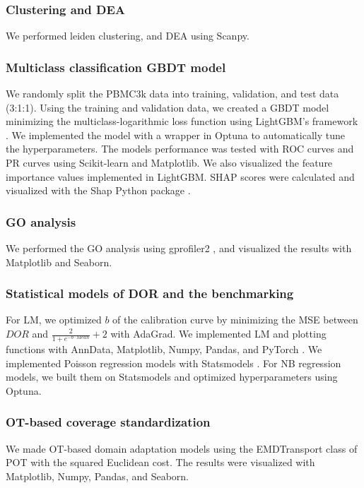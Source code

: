\documentclass{article}
\begin{document}
\subsubsection*{Clustering and DEA}
We performed leiden clustering, and \ac{DEA} using Scanpy.

\subsubsection*{Multiclass classification GBDT model}
We randomly split the PBMC3k data into training, validation, and test data (3:1:1). Using the training and 
validation data, we created a GBDT model minimizing the multiclass-logarithmic loss function using LightGBM's 
framework \cite{lightgbm}. We implemented the model with a wrapper in Optuna \cite{optuna} to automatically tune the hyperparameters. 
The models performance was tested with ROC curves and PR curves using Scikit-learn \cite{scikit-learn} and Matplotlib. 
We also visualized the feature importance values implemented in LightGBM. SHAP scores were calculated and 
visualized with the Shap Python package \cite{shap,shap_treeexplainer}.

\subsubsection*{GO analysis}
We performed the GO analysis using gprofiler2 \cite{gprofiler2}, and visualized the results with Matplotlib and Seaborn.

\subsubsection*{Statistical models of DOR and the benchmarking}
For LM, we optimized $b$ of the calibration curve by minimizing the MSE between $DOR$ and $\frac{2}{1+e^{-b\cdot Mean}}+2$ with 
AdaGrad. We implemented LM and plotting functions with AnnData, Matplotlib, Numpy, Pandas, and PyTorch \cite{pytorch}. 
We implemented Poisson regression models with Statsmodels \cite{statsmodels}. For NB regression models, we built them 
on Statsmodels and optimized hyperparameters using Optuna.

\subsubsection*{OT-based coverage standardization}
We made OT-based domain adaptation models using the EMDTransport class of POT \cite{pot} with the squared 
Euclidean cost. The results were visualized with Matplotlib, Numpy, Pandas, and Seaborn.
\end{document}
